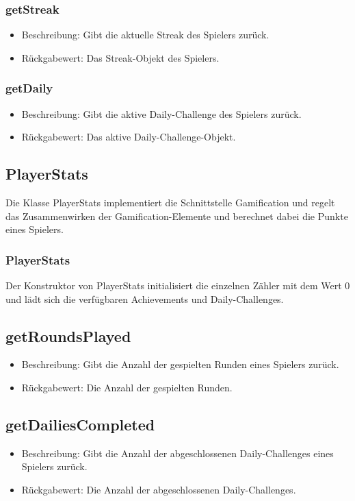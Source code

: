 \documentclass[a4paper]{scrreprt}
\begin{document}
	\subsubsection{getStreak}
	\begin{itemize}
		\item Beschreibung: Gibt die aktuelle Streak des Spielers zurück.
		\item Rückgabewert: Das Streak-Objekt des Spielers.
	\end{itemize}
	\subsubsection{getDaily}
	\begin{itemize}
		\item Beschreibung: Gibt die aktive Daily-Challenge des Spielers zurück.
		\item Rückgabewert: Das aktive Daily-Challenge-Objekt.
	\end{itemize}



	\subsection{PlayerStats}
	Die Klasse PlayerStats implementiert die Schnittstelle Gamification und regelt das Zusammenwirken der Gamification-Elemente und berechnet dabei die Punkte eines Spielers.

	\subsubsection{PlayerStats}
	Der Konstruktor von PlayerStats initialisiert die einzelnen Zähler mit dem Wert 0 und lädt sich die verfügbaren Achievements und Daily-Challenges.
	\subsection{getRoundsPlayed}
	\begin{itemize}
		\item Beschreibung: Gibt die Anzahl der gespielten Runden eines Spielers zurück.
		\item Rückgabewert: Die Anzahl der gespielten Runden.
	\end{itemize}
	\subsection{getDailiesCompleted}
	\begin{itemize}
		\item Beschreibung: Gibt die Anzahl der abgeschlossenen Daily-Challenges eines Spielers zurück.
		\item Rückgabewert: Die Anzahl der abgeschlossenen Daily-Challenges.
	\end{itemize}
\end{document}
